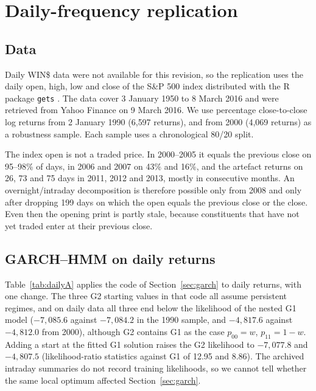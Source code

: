 \documentclass[11pt,a4paper]{article}
\theoremstyle{plain}
\theoremstyle{remark}
\begin{document}
\section{Daily-frequency replication}\label{sec:daily}

\subsection{Data}
Daily WIN\$ data were not available for this revision, so the replication uses the daily open, high, low and close of the S\&P 500 index distributed with the R package \texttt{gets} \citep{pretis2018}. The data cover 3 January 1950 to 8 March 2016 and were retrieved from Yahoo Finance on 9 March 2016. We use percentage close-to-close log returns from 2 January 1990 (6{,}597 returns), and from 2000 (4{,}069 returns) as a robustness sample. Each sample uses a chronological 80/20 split.

The index open is not a traded price. In 2000--2005 it equals the previous close on 95--98\% of days, in 2006 and 2007 on 43\% and 16\%, and the artefact returns on 26, 73 and 75 days in 2011, 2012 and 2013, mostly in consecutive months. An overnight/intraday decomposition is therefore possible only from 2008 and only after dropping 199 days on which the open equals the previous close or the close. Even then the opening print is partly stale, because constituents that have not yet traded enter at their previous close. 

\subsection{GARCH--HMM on daily returns}
Table~\ref{tab:dailyA} applies the code of Section~\ref{sec:garch} to daily returns, with one change. The three G2 starting values in that code all assume persistent regimes, and on daily data all three end below the likelihood of the nested G1 model ($-7{,}085.6$ against $-7{,}084.2$ in the 1990 sample, and $-4{,}817.6$ against $-4{,}812.0$ from 2000), although G2 contains G1 as the case $p_{00}=w$, $p_{11}=1-w$. Adding a start at the fitted G1 solution raises the G2 likelihood to $-7{,}077.8$ and $-4{,}807.5$ (likelihood-ratio statistics against G1 of 12.95 and 8.86). The archived intraday summaries do not record training likelihoods, so we cannot tell whether the same local optimum affected Section~\ref{sec:garch}. 
\end{document}
